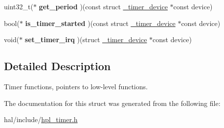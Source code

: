 \begin{DoxyCompactItemize}
\item 
\mbox{\label{struct__timer__hpl__interface_a0c1dcb4735372cd445da9d8fb9565b61}} 
uint32\+\_\+t($\ast$ {\bfseries get\+\_\+period} )(const struct \hyperlink{struct__timer__device}{\+\_\+timer\+\_\+device} $\ast$const device)
\item 
\mbox{\label{struct__timer__hpl__interface_a8fa50445e57394bf1a7d1d361928a5d1}} 
bool($\ast$ {\bfseries is\+\_\+timer\+\_\+started} )(const struct \hyperlink{struct__timer__device}{\+\_\+timer\+\_\+device} $\ast$const device)
\item 
\mbox{\label{struct__timer__hpl__interface_a9316842bee4d73d75a68f02383feac14}} 
void($\ast$ {\bfseries set\+\_\+timer\+\_\+irq} )(struct \hyperlink{struct__timer__device}{\+\_\+timer\+\_\+device} $\ast$const device)
\end{DoxyCompactItemize}


\subsection{Detailed Description}
Timer functions, pointers to low-\/level functions. 

The documentation for this struct was generated from the following file\+:\begin{DoxyCompactItemize}
\item 
hal/include/\hyperlink{hpl__timer_8h}{hpl\+\_\+timer.\+h}\end{DoxyCompactItemize}
